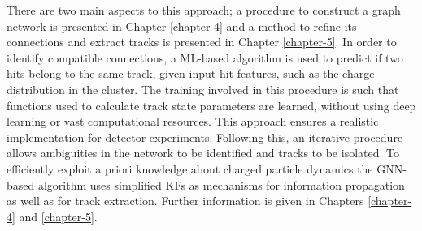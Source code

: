 There are two main aspects to this approach; a procedure to construct a graph network is presented in Chapter \ref{chapter-4} and a method to refine its connections and extract tracks is presented in Chapter \ref{chapter-5}. In order to identify compatible connections, a ML-based algorithm is used to predict if two hits belong to the same track, given input hit features, such as the charge distribution in the cluster. The training involved in this procedure is such that functions used to calculate track state parameters are learned, without using deep learning or vast computational resources. This approach ensures a realistic implementation for detector experiments. Following this, an iterative procedure allows ambiguities in the network to be identified and tracks to be isolated. To efficiently exploit a priori knowledge about charged particle dynamics the GNN-based algorithm uses simplified KFs as mechanisms for information propagation as well as for track extraction. Further information is given in Chapters \ref{chapter-4} and \ref{chapter-5}.